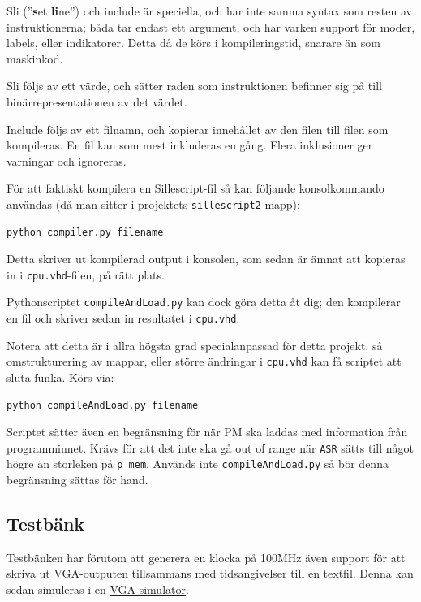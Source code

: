 \documentclass[]{article}
\begin{document}
\noindent
Sli (''\textbf{s}et \textbf{li}ne'') och include är speciella, och har inte samma syntax som resten av instruktionerna; båda tar endast ett argument, och har varken support för moder, labels, eller indikatorer. Detta då de körs i kompileringstid, snarare än som maskinkod.

Sli följs av ett värde, och sätter raden som instruktionen befinner sig på till binärrepresentationen av det värdet.

Include följs av ett filnamn, och kopierar innehållet av den filen till filen som kompileras. En fil kan som mest inkluderas en gång. Flera inklusioner ger varningar och ignoreras.

För att faktiskt kompilera en Sillescript-fil så kan följande konsolkommando användas (då man sitter i projektets \texttt{sillescript2}-mapp):\\

\begin{Verbatim}[frame=single]
python compiler.py filename
\end{Verbatim}

\noindent
Detta skriver ut kompilerad output i konsolen, som sedan är ämnat att kopieras in i \texttt{cpu.vhd}-filen, på rätt plats. 

Pythonscriptet \texttt{compileAndLoad.py} kan dock göra detta åt dig; den kompilerar en fil och skriver sedan in resultatet i \texttt{cpu.vhd}. 

Notera att detta är i allra högsta grad specialanpassad för detta projekt, så omstrukturering av mappar, eller större ändringar i \texttt{cpu.vhd} kan få scriptet att sluta funka. Körs via:\\

\begin{Verbatim}[frame=single]
python compileAndLoad.py filename
\end{Verbatim}

\noindent
Scriptet sätter även en begränsning för när PM ska laddas med information från programminnet. Krävs för att det inte ska gå out of range när \texttt{ASR} sätts till något högre än storleken på \texttt{p\_mem}. Används inte \texttt{compileAndLoad.py} så bör denna begränsning sättas för hand.

\subsection{Testbänk}
Testbänken har förutom att generera en klocka på 100MHz även support för att skriva ut VGA-outputen tillsammans med tidsangivelser till en textfil. Denna kan sedan simuleras i en \href{http://ericeastwood.com/lab/vga-simulator/}{VGA-simulator}.
\end{document}
